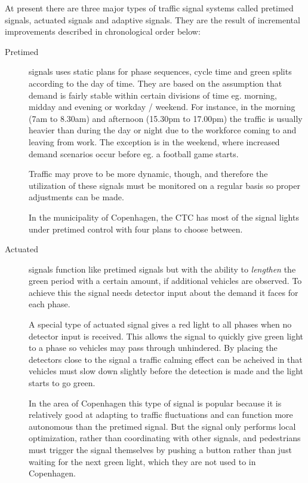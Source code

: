 \label{signal_types}

At present there are three major types of traffic signal systems called pretimed signals, actuated signals and adaptive signals. They are the result of incremental improvements described in chronological order below:

\begin{description}
\item[Pretimed] signals uses static plans for phase sequences, cycle time and green splits according to the day of time. 
\label{pretimed}
They are based on the assumption that demand is fairly stable within certain divisions of time eg. morning, midday and evening or workday / weekend. For instance, in the morning (7am to 8.30am) and afternoon (15.30pm to 17.00pm) the traffic is usually heavier than during the day or night due to the workforce coming to and leaving from work. The exception is in the weekend, where increased demand scenarios occur before eg. a football game starts.

Traffic may prove to be more dynamic, though, and therefore the utilization of these signals must be monitored on a regular basis so proper adjustments can be made.

In the municipality of Copenhagen, the CTC has most of the signal lights under pretimed control with four plans to choose between.
\item[Actuated] signals function like pretimed signals but with the ability to \textit{lengthen} the green period with a certain amount, if additional vehicles are observed. 
\label{actuated}
To achieve this the signal needs detector input about the demand it faces for each phase.

A special type of actuated signal gives a red light to all phases when no detector input is received. This allows the signal to quickly give green light to a phase so vehicles may pass through unhindered. By placing the detectors close to the signal a traffic calming effect can be acheived in that vehicles must slow down slightly before the detection is made and the light starts to go green.

In the area of Copenhagen this type of signal is popular because it is relatively good at adapting to traffic fluctuations and can function more autonomous than the pretimed signal. But the signal only performs local optimization, rather than coordinating with other signals, and pedestrians must trigger the signal themselves by pushing a button rather than just waiting for the next green light, which they are not used to in Copenhagen.


\end{description}
